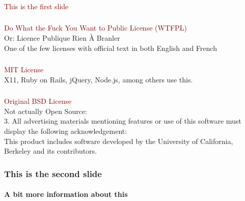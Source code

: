 \documentclass[c]{beamer}
\begin{document}
  \begin{frame}
    \frametitle{}
    \textcolor{darkred}{{\fontsize{60pt}{1em}\selectfont This is the first slide}}
  \end{frame}
  \begin{frame}
    \frametitle{}
    \textcolor{darkred}{{\fontsize{50pt}{1em}\selectfont Do What the Fuck You Want to Public License (WTFPL) \\}}
    Or: Licence Publique Rien À Branler \\
    One of the few licenses with official text in both English and French  \\
  \end{frame}
  \begin{frame}
    \frametitle{}
    \textcolor{darkred}{{\fontsize{50pt}{1em}\selectfont MIT License \\}}
    X11, Ruby on Rails, jQuery, Node.js, among others use this. \\
  \end{frame}
  \begin{frame}
    \frametitle{}
    \textcolor{darkred}{{\fontsize{50pt}{1em}\selectfont Original BSD License \\}}
    Not actually Open Source: \\
    3. All advertising materials mentioning features or use of this software must display the following acknowledgement: \\
     This product includes software developed by the University of California, Berkeley and its contributors. \\
  \end{frame}
  \begin{frame}
    \frametitle{This is the second slide}
    \framesubtitle{A bit more information about this}
  \end{frame}
\end{document}
